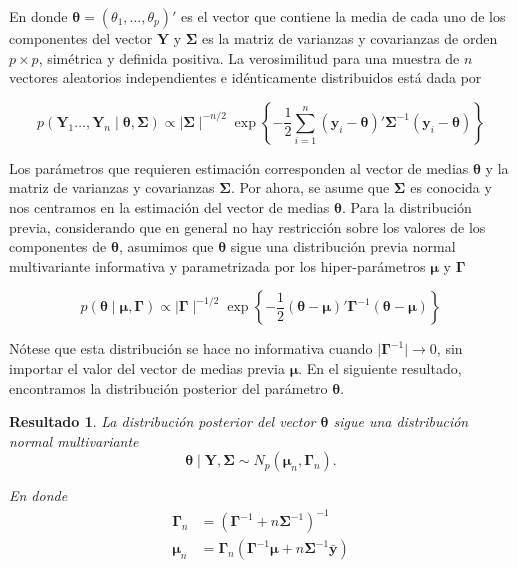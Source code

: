 \documentclass[
  10pt,
  spanish,
]{book}
\newtheorem{proposition}{Resultado}[chapter]
\theoremstyle{definition}
\theoremstyle{definition}
\theoremstyle{definition}
\theoremstyle{definition}
\theoremstyle{remark}
\begin{document}
En donde \(\boldsymbol \theta=(\theta_1,\ldots,\theta_p)'\) es el vector que contiene la media de cada uno de los componentes del vector \(\mathbf{Y}\) y \(\boldsymbol \Sigma\) es la matriz de varianzas y covarianzas de orden \(p\times p\), simétrica y definida positiva. La verosimilitud para una muestra de \(n\) vectores aleatorios independientes e idénticamente distribuidos está dada por

\begin{equation*}
  p(\mathbf{Y}_1\ldots,\mathbf{Y}_n \mid \boldsymbol \theta,\boldsymbol \Sigma)\propto \mid \boldsymbol \Sigma\mid ^{-n/2}
  \exp\left\{-\frac{1}{2}\sum_{i=1}^n(\mathbf{y}_i-\boldsymbol \theta)'\boldsymbol \Sigma^{-1}(\mathbf{y}_i-\boldsymbol \theta)\right\}
\end{equation*}

Los parámetros que requieren estimación corresponden al vector de medias \(\boldsymbol \theta\) y la matriz de varianzas y covarianzas \(\boldsymbol \Sigma\). Por ahora, se asume que \(\boldsymbol \Sigma\) es conocida y nos centramos en la estimación del vector de medias \(\boldsymbol \theta\). Para la distribución previa, considerando que en general no hay restricción sobre los valores de los componentes de \(\boldsymbol \theta\), asumimos que \(\boldsymbol \theta\) sigue una distribución previa normal multivariante informativa y parametrizada por los hiper-parámetros \(\boldsymbol \mu\) y \(\boldsymbol \Gamma\)

\begin{equation*}
p(\boldsymbol \theta\mid \boldsymbol \mu,\boldsymbol \Gamma)\propto \mid \boldsymbol \Gamma\mid ^{-1/2}
\exp\left\{-\frac{1}{2}(\boldsymbol \theta-\boldsymbol \mu)'\boldsymbol \Gamma^{-1}(\boldsymbol \theta-\boldsymbol \mu)\right\}
\end{equation*}

Nótese que esta distribución se hace no informativa cuando \(\mid \boldsymbol \Gamma^{-1} \mid \longrightarrow 0\), sin importar el valor del vector de medias previa \(\boldsymbol \mu\). En el siguiente resultado, encontramos la distribución posterior del parámetro \(\boldsymbol \theta\).

\begin{proposition}
\protect\hypertarget{prp:unnamed-chunk-23}{}{\label{prp:unnamed-chunk-23} }La distribución posterior del vector \(\boldsymbol \theta\) sigue una distribución normal multivariante
\begin{equation*}
\boldsymbol \theta\mid \mathbf{Y},\boldsymbol \Sigma\sim N_p (\boldsymbol \mu_n,\boldsymbol \Gamma_n).
\end{equation*}

En donde
\begin{align}
\label{eq:Gamman}
\boldsymbol \Gamma_n &= \left(\boldsymbol \Gamma^{-1}+n\boldsymbol \Sigma^{-1}\right)^{-1}\\
\label{eq:mun}
\boldsymbol \mu_n &= \boldsymbol \Gamma_n(\boldsymbol \Gamma^{-1}\boldsymbol \mu+n \boldsymbol \Sigma^{-1}\bar{\mathbf{y}})
\end{align}
\end{proposition}
\end{document}
